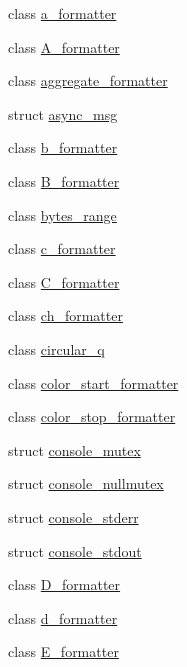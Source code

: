 \begin{DoxyCompactItemize}
\item 
class \hyperlink{classspdlog_1_1details_1_1a__formatter}{a\+\_\+formatter}
\item 
class \hyperlink{classspdlog_1_1details_1_1_a__formatter}{A\+\_\+formatter}
\item 
class \hyperlink{classspdlog_1_1details_1_1aggregate__formatter}{aggregate\+\_\+formatter}
\item 
struct \hyperlink{structspdlog_1_1details_1_1async__msg}{async\+\_\+msg}
\item 
class \hyperlink{classspdlog_1_1details_1_1b__formatter}{b\+\_\+formatter}
\item 
class \hyperlink{classspdlog_1_1details_1_1_b__formatter}{B\+\_\+formatter}
\item 
class \hyperlink{classspdlog_1_1details_1_1bytes__range}{bytes\+\_\+range}
\item 
class \hyperlink{classspdlog_1_1details_1_1c__formatter}{c\+\_\+formatter}
\item 
class \hyperlink{classspdlog_1_1details_1_1_c__formatter}{C\+\_\+formatter}
\item 
class \hyperlink{classspdlog_1_1details_1_1ch__formatter}{ch\+\_\+formatter}
\item 
class \hyperlink{classspdlog_1_1details_1_1circular__q}{circular\+\_\+q}
\item 
class \hyperlink{classspdlog_1_1details_1_1color__start__formatter}{color\+\_\+start\+\_\+formatter}
\item 
class \hyperlink{classspdlog_1_1details_1_1color__stop__formatter}{color\+\_\+stop\+\_\+formatter}
\item 
struct \hyperlink{structspdlog_1_1details_1_1console__mutex}{console\+\_\+mutex}
\item 
struct \hyperlink{structspdlog_1_1details_1_1console__nullmutex}{console\+\_\+nullmutex}
\item 
struct \hyperlink{structspdlog_1_1details_1_1console__stderr}{console\+\_\+stderr}
\item 
struct \hyperlink{structspdlog_1_1details_1_1console__stdout}{console\+\_\+stdout}
\item 
class \hyperlink{classspdlog_1_1details_1_1_d__formatter}{D\+\_\+formatter}
\item 
class \hyperlink{classspdlog_1_1details_1_1d__formatter}{d\+\_\+formatter}
\item 
class \hyperlink{classspdlog_1_1details_1_1_e__formatter}{E\+\_\+formatter}

\end{DoxyCompactItemize}
